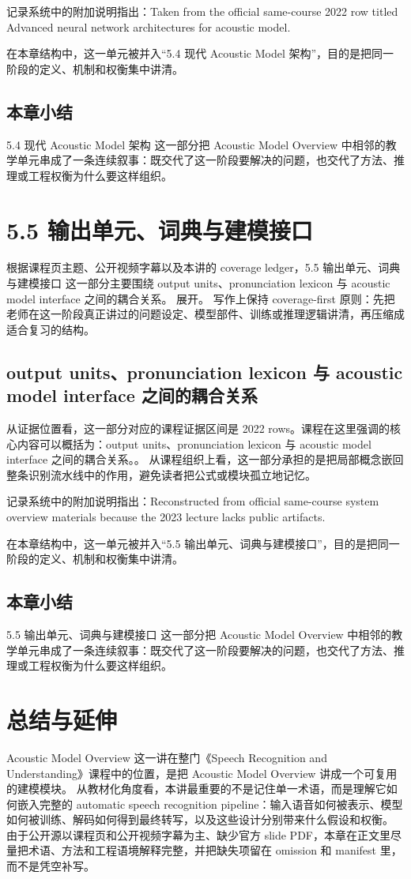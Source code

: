 \documentclass[a4paper]{article}
\begin{document}
记录系统中的附加说明指出：Taken from the official same-course 2022 row titled Advanced neural network architectures for acoustic model.

在本章结构中，这一单元被并入“5.4 现代 Acoustic Model 架构”，目的是把同一阶段的定义、机制和权衡集中讲清。

\subsection{本章小结}
5.4 现代 Acoustic Model 架构 这一部分把 Acoustic Model Overview 中相邻的教学单元串成了一条连续叙事：既交代了这一阶段要解决的问题，也交代了方法、推理或工程权衡为什么要这样组织。

\section{5.5 输出单元、词典与建模接口}
根据课程页主题、公开视频字幕以及本讲的 coverage ledger，5.5 输出单元、词典与建模接口 这一部分主要围绕 output units、pronunciation lexicon 与 acoustic model interface 之间的耦合关系。 展开。
写作上保持 coverage-first 原则：先把老师在这一阶段真正讲过的问题设定、模型部件、训练或推理逻辑讲清，再压缩成适合复习的结构。

\subsection{output units、pronunciation lexicon 与 acoustic model interface 之间的耦合关系}
从证据位置看，这一部分对应的课程证据区间是 2022 rows。课程在这里强调的核心内容可以概括为：output units、pronunciation lexicon 与 acoustic model interface 之间的耦合关系。。
从课程组织上看，这一部分承担的是把局部概念嵌回整条识别流水线中的作用，避免读者把公式或模块孤立地记忆。

记录系统中的附加说明指出：Reconstructed from official same-course system overview materials because the 2023 lecture lacks public artifacts.

在本章结构中，这一单元被并入“5.5 输出单元、词典与建模接口”，目的是把同一阶段的定义、机制和权衡集中讲清。

\subsection{本章小结}
5.5 输出单元、词典与建模接口 这一部分把 Acoustic Model Overview 中相邻的教学单元串成了一条连续叙事：既交代了这一阶段要解决的问题，也交代了方法、推理或工程权衡为什么要这样组织。

\section{总结与延伸}
Acoustic Model Overview 这一讲在整门《Speech Recognition and Understanding》课程中的位置，是把 Acoustic Model Overview 讲成一个可复用的建模模块。
从教材化角度看，本讲最重要的不是记住单一术语，而是理解它如何嵌入完整的 automatic speech recognition pipeline：输入语音如何被表示、模型如何被训练、解码如何得到最终转写，以及这些设计分别带来什么假设和权衡。
由于公开源以课程页和公开视频字幕为主、缺少官方 slide PDF，本章在正文里尽量把术语、方法和工程语境解释完整，并把缺失项留在 omission 和 manifest 里，而不是凭空补写。
\end{document}
